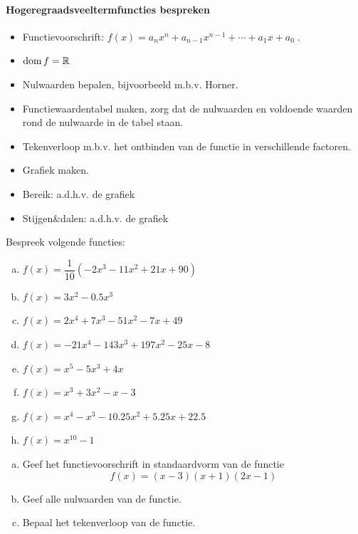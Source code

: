 \documentclass[12pt,twoside,a4paper]{article}
\begin{document}
\paragraph*{Hogeregraadsveeltermfuncties bespreken}
\begin{mdframed}
  \begin{itemize}
  \item Functievoorschrift: $f(x)= a_nx^n + a_{n-1}x^{n-1} + \cdots + a_1x + a_0\;.$
  \item $\dom f = \mathbb{R}$
  \item Nulwaarden bepalen, bijvoorbeeld m.b.v. Horner.
  \item Functiewaardentabel maken, zorg dat de nulwaarden en voldoende waarden rond de nulwaarde in de tabel staan.
  \item Tekenverloop m.b.v. het ontbinden van de functie in verschillende factoren.
  \item Grafiek maken.
  \item Bereik: a.d.h.v. de grafiek
  \item Stijgen\&dalen: a.d.h.v. de grafiek
  \end{itemize}
\end{mdframed}

\begin{oefening}
  Bespreek volgende functies:
  \begin{multicols}{2}
    \begin{enumerate}[(a)]
      \itemsep.8em
    \item $f(x)=\dfrac{1}{10}(-2x^3-11x^2+21x+90)$
    \item $f(x)=3x^2-0.5x^3$
    \item $f(x)=2x^4+7x^3-51x^2-7x+49$
    \item $f(x)=-21x^4-143x^3+197x^2-25x-8$
    \item $f(x)=x^5-5x^3+4x$
    \item $f(x)=x^3+3x^2-x-3$
    \item $f(x)=x^4-x^3-10.25x^2+5.25x+22.5$
    \item $f(x)=x^{10}-1$
    \end{enumerate}
  \end{multicols}
\end{oefening}

\begin{oefening}
\begin{enumerate}[(a)]
  \item Geef het functievoorschrift in standaardvorm van de functie
$$f(x)=(x-3)(x+1)(2x-1)$$
  \item Geef alle nulwaarden van de functie.
  \item Bepaal het tekenverloop van de functie.
\end{enumerate}
\end{oefening}
\end{document}
